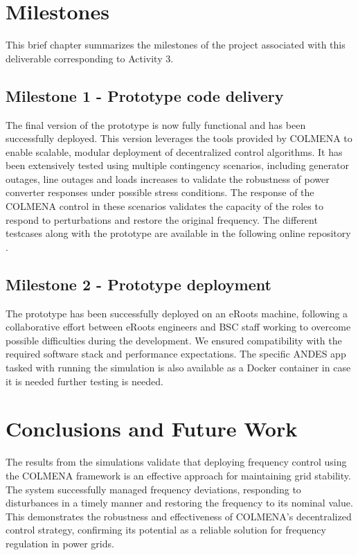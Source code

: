 \documentclass{article}
\begin{document}
\newpage
\section{Milestones}
This brief chapter summarizes the milestones of the project associated with this deliverable corresponding to Activity 3.

\subsection*{Milestone 1 - Prototype code delivery}

The final version of the prototype is now fully functional and has been successfully deployed. This version leverages the tools provided by COLMENA to enable scalable, modular deployment of decentralized control algorithms. It has been extensively tested using multiple contingency scenarios, including generator outages, line outages and loads increases to validate the robustness of power converter responses under possible stress conditions. The response of the COLMENA control in these scenarios validates the capacity of the roles to respond to perturbations and restore the original frequency. The different testcases along with the prototype are available in the following online repository \cite{repo:colmenaeroots}.

\subsection*{Milestone 2 - Prototype deployment}

The prototype has been successfully deployed on an eRoots machine, following a collaborative effort between eRoots engineers and BSC staff working to overcome possible difficulties during the development. We ensured compatibility with the required software stack and performance expectations. The specific ANDES app tasked with running the simulation is also available as a Docker container in case it is needed further testing is needed. 

\newpage
\section{Conclusions and Future Work}

The results from the simulations validate that deploying frequency control using the COLMENA framework is an effective approach for maintaining grid stability. The system successfully managed frequency deviations, responding to disturbances in a timely manner and restoring the frequency to its nominal value. This demonstrates the robustness and effectiveness of COLMENA's decentralized control strategy, confirming its potential as a reliable solution for frequency regulation in power grids.
\end{document}
